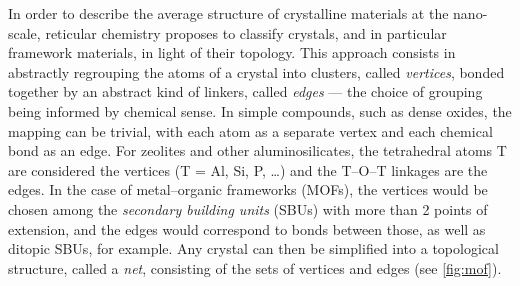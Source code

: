 \documentclass[main.tex]{subfiles}
\begin{document}
\label{topology_introduction}

In order to describe the average structure of crystalline materials at the nano-scale, reticular chemistry \autocite{reticularChemistry, reticularSynthesis} proposes to classify crystals, and in particular framework materials, in light of their topology. This approach consists in abstractly regrouping the atoms of a crystal into clusters, called \emph{vertices}, bonded together by an abstract kind of linkers, called \emph{edges} --- the choice of grouping being informed by chemical sense. In simple compounds, such as dense oxides, the mapping can be trivial, with each atom as a separate vertex and each chemical bond as an edge. For zeolites and other aluminosilicates, the tetrahedral atoms T are considered the vertices (T = Al, Si, P, \ldots) and the T--O--T linkages are the edges. In the case of metal--organic frameworks (MOFs), the vertices would be chosen among the \emph{secondary building units} (SBUs) \autocite{SBUs} with more than 2 points of extension, and the edges would correspond to bonds between those, as well as ditopic SBUs, for example. Any crystal can then be simplified into a topological structure, called a \emph{net}, consisting of the sets of vertices and edges (see \cref{fig:mof}).
\end{document}
